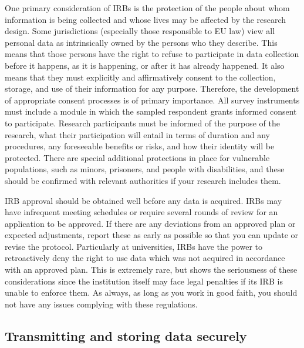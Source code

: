 One primary consideration of IRBs
is the protection of the people about whom information is being collected
and whose lives may be affected by the research design.
Some jurisdictions (especially those responsible to EU law) view all personal data
as intrinsically owned by the persons who they describe.
This means that those persons have the right to refuse to participate in data collection
before it happens, as it is happening, or after it has already happened.
It also means that they must explicitly and affirmatively consent
to the collection, storage, and use of their information for any purpose.
Therefore, the development of appropriate consent processes is of primary importance.
All survey instruments must include a module in which the sampled respondent grants informed consent to participate.
Research participants must be informed of the purpose of the research, 
what their participation will entail in terms of duration and any procedures,
any foreseeable benefits or risks, 
and how their identity will be protected.
There are special additional protections in place for vulnerable populations,
such as minors, prisoners, and people with disabilities,
and these should be confirmed with relevant authorities if your research includes them.

IRB approval should be obtained well before any data is acquired. 
IRBs may have infrequent meeting schedules
or require several rounds of review for an application to be approved.
If there are any deviations from an approved plan or expected adjustments,
report these as early as possible so that you can update or revise the protocol.
Particularly at universities, IRBs have the power to retroactively deny
the right to use data which was not acquired in accordance with an approved plan.
This is extremely rare, but shows the seriousness of these considerations
since the institution itself may face legal penalties if its IRB
is unable to enforce them. As always, as long as you work in good faith,
you should not have any issues complying with these regulations.

\subsection{Transmitting and storing data securely}

